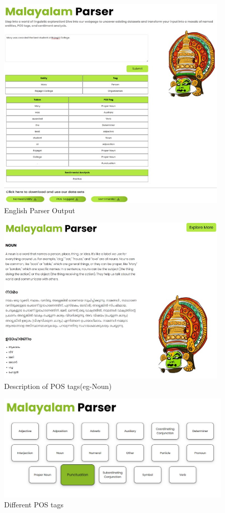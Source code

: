 \documentclass[12pt,a4paper,titlepage]{report}
\begin{document}
		\begin{figure}[H]
			\centering
			\includegraphics[width=11cm]{./eng_parser.jpeg}
			\caption{English Parser Output}
		\end{figure}
		
		\begin{figure}[H]
			\centering
			\includegraphics[width=11cm]{./noun.jpeg}
			\caption{Description of POS tags(eg-Noun)}
		\end{figure}
		
		\begin{figure}[H]
			\centering
			\includegraphics[width=14cm]{./explore.jpeg}
			\caption{Different POS tags}
		\end{figure}
		
\end{document}
